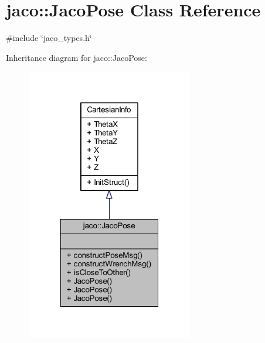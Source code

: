 \hypertarget{classjaco_1_1JacoPose}{}\section{jaco\+:\+:Jaco\+Pose Class Reference}
\label{classjaco_1_1JacoPose}


{\ttfamily \#include \char`\"{}jaco\+\_\+types.\+h\char`\"{}}



Inheritance diagram for jaco\+:\+:Jaco\+Pose\+:
\nopagebreak
\begin{figure}[H]
\begin{center}
\leavevmode
\includegraphics[width=205pt]{d3/d5f/classjaco_1_1JacoPose__inherit__graph}
\end{center}
\end{figure}


